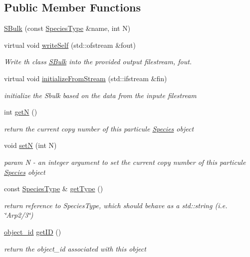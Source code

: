 \subsection*{Public Member Functions}
\begin{DoxyCompactItemize}
\item 
\hyperlink{classSBulk_ad4c6f917b6456d8b6e38ee776419c6c6}{S\-Bulk} (const \hyperlink{Species_8h_af8f3afcc030f67a124aa4a6b5badf495}{Species\-Type} \&name, int N)
\item 
virtual void \hyperlink{classSBulk_af96d228dfe5348a5a7944b69c3ddf8fa}{write\-Self} (std\-::ofstream \&fout)
\begin{DoxyCompactList}\small\item\em Write th class \hyperlink{classSBulk}{S\-Bulk} into the provided output filestream, fout. \end{DoxyCompactList}\item 
virtual void \hyperlink{classSBulk_aade6080b259012cbf1a5a84d64352358}{initialize\-From\-Stream} (std\-::ifstream \&fin)
\begin{DoxyCompactList}\small\item\em initialize the Sbulk based on the data from the inpute filestream \end{DoxyCompactList}\item 
int \hyperlink{classSpecies_a166f138f95713c4fd02dfb47a81b515b}{get\-N} ()
\begin{DoxyCompactList}\small\item\em return the current copy number of this particule \hyperlink{classSpecies}{Species} object \end{DoxyCompactList}\item 
void \hyperlink{classSpecies_af40a72d3e3f8d3cc7bf1dfe209bed39b}{set\-N} (int N)
\begin{DoxyCompactList}\small\item\em param N -\/ an integer argument to set the current copy number of this particule \hyperlink{classSpecies}{Species} object \end{DoxyCompactList}\item 
const \hyperlink{Species_8h_af8f3afcc030f67a124aa4a6b5badf495}{Species\-Type} \& \hyperlink{classSpecies_a7b99d16574deaba7a1f4b60d93f33304}{get\-Type} ()
\begin{DoxyCompactList}\small\item\em return reference to Species\-Type, which should behave as a std\-::string (i.\-e. \char`\"{}\-Arp2/3\char`\"{}) \end{DoxyCompactList}\item 
\hyperlink{Object_8h_a0b56ddf6ace42572542aae1f2c364e05}{object\-\_\-id} \hyperlink{classObject_a4dd34b912b01d62f8e5aa9bcb4e82e81}{get\-I\-D} ()
\begin{DoxyCompactList}\small\item\em return the object\-\_\-id associated with this object \end{DoxyCompactList}\end{DoxyCompactItemize}
